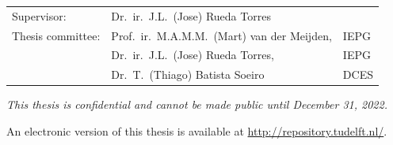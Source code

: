 \begin{titlepage}
\begin{center}
\begin{tabular}{lll}
    Supervisor: & Dr.\ ir.\ J.L.\ (Jose) Rueda Torres \\
    Thesis committee:
        & Prof.\ ir.\ M.A.M.M.\ (Mart) van der Meijden, & IEPG\\
        & Dr.\ ir.\ J.L.\ (Jose) Rueda Torres, & IEPG  \\
        & Dr.\ T.\ (Thiago) Batista Soeiro & DCES \\
        
\end{tabular}

\vspace{35mm}
\bigskip
\emph{This thesis is confidential and cannot be made public until December 31, 2022.}

\bigskip

An electronic version of this thesis is available at \url{http://repository.tudelft.nl/}.
\vspace{15mm}
\end{center}

\end{titlepage}

